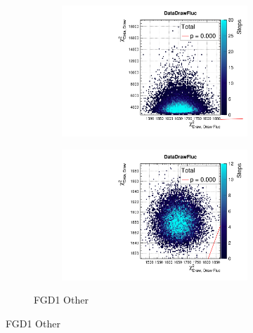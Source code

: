 \begin{figure}[h]
\begin{subfigure}[t]{\textwidth}
\begin{subfigure}[t]{0.24\textwidth}
\end{subfigure}
\begin{subfigure}[t]{0.24\textwidth}
\includegraphics[width=\textwidth, trim={0mm 0mm 0mm 8mm}, clip,page=29]{figures/mach3/data/priorpred/2017b_NewDet_3Xsec_4Det_5Flux_NewXSecTune_Data_merge_PriorPred_procs}
\end{subfigure}
\begin{subfigure}[t]{0.24\textwidth}
	\includegraphics[width=\textwidth, trim={0mm 0mm 0mm 8mm}, clip,page=29]{figures/mach3/data/postpred/2017b_NewData_NewDet_UpdXsecStep_2Xsec_4Det_5Flux_0_PostPred_procs}
\end{subfigure}
\caption{FGD1 Other}
\end{subfigure}


\end{figure}
